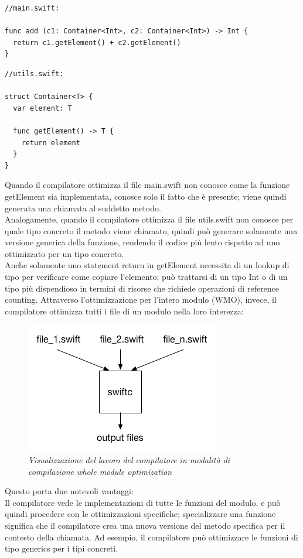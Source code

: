 \begin{lstlisting}
//main.swift:

func add (c1: Container<Int>, c2: Container<Int>) -> Int {
  return c1.getElement() + c2.getElement()
}
\end{lstlisting}
\begin{lstlisting}
//utils.swift:

struct Container<T> {
  var element: T

  func getElement() -> T {
    return element
  }
}
\end{lstlisting}
Quando il compilatore ottimizza il file main.swift non conosce come la funzione getElement sia implementata, conosce solo il fatto che è presente; viene quindi generata una chiamata al suddetto metodo.\\
Analogamente, quando il compilatore ottimizza il file utils.swift non conosce per quale tipo concreto il metodo viene chiamato, quindi può generare solamente una versione generica della funzione, rendendo il codice più lento rispetto ad uno ottimizzato per un tipo concreto.\\
Anche solamente uno statement return in getElement necessita di un lookup di tipo per verificare come copiare l'elemento; può trattarsi di un tipo Int o di un tipo più dispendioso in termini di risorse che richiede operazioni di reference counting.\newpage
Attraverso l'ottimizzazione per l'intero modulo (WMO), invece, il compilatore ottimizza tutti i file di un modulo nella loro interezza: 
\begin{figure}[H]
      \centering
      \includegraphics[scale=0.80]{immagini/wmo.png}
            \vspace{0.8cm}
            \caption{\textit{Visualizzazione del lavoro del compilatore in modalità di compilazione whole module optimization}}
\end{figure}
Questo porta due notevoli vantaggi:\\
Il compilatore vede le implementazioni di tutte le funzioni del modulo, e può quindi procedere con le ottimizzazioni specifiche; specializzare una funzione significa che il compilatore crea una nuova versione del metodo specifica per il contesto della chiamata. Ad esempio, il compilatore può ottimizzare le funzioni di tipo generics per i tipi concreti.\\
